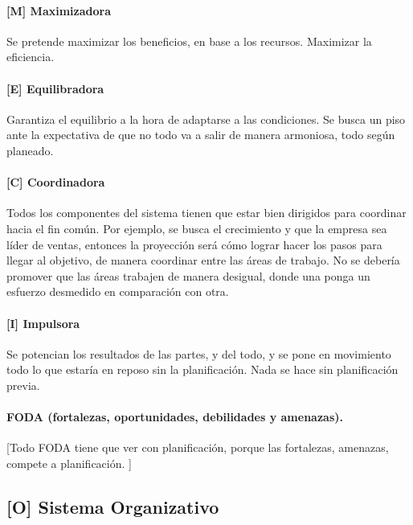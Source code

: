 \hypertarget{maximizadora}{%
\paragraph{{[}M{]} Maximizadora}\label{maximizadora}}
Se pretende maximizar los beneficios, en base a
los recursos. Maximizar la eficiencia. 

\hypertarget{equilibradora}{%
\paragraph{{[}E{]} Equilibradora}\label{equilibradora}}
Garantiza el equilibrio a la hora de adaptarse a las condiciones. Se
busca un piso ante la expectativa de que no todo va a salir de manera
armoniosa, todo según planeado. 

\hypertarget{coordinadora}{%
\paragraph{{[}C{]} Coordinadora}\label{coordinadora}}
Todos los
componentes del sistema tienen que estar bien dirigidos para coordinar
hacia el fin común. Por ejemplo, se busca el crecimiento y que la
empresa sea líder de ventas, entonces la proyección será cómo lograr
hacer los pasos para llegar al objetivo, de manera coordinar entre las
áreas de trabajo. No se debería promover que las áreas trabajen de
manera desigual, donde una ponga un esfuerzo desmedido en comparación
con otra.

\hypertarget{impulsora}{%
\paragraph{{[}I{]} Impulsora}\label{impulsora}}
Se potencian los resultados de las
partes, y del todo, y se pone en movimiento todo lo que estaría en
reposo sin la planificación. Nada se hace sin planificación previa.

\paragraph*{FODA (fortalezas, oportunidades, debilidades y amenazas).} [Todo FODA tiene que ver con planificación, porque las
fortalezas, amenazas, compete a planificación.%
]

\hypertarget{sistema-organizativo}{%
\subsection{{[}O{]} Sistema Organizativo}\label{sistema-organizativo}}


